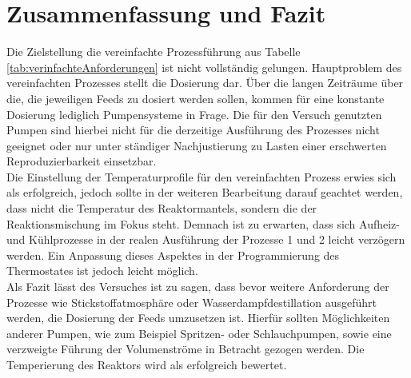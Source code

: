 \section{Zusammenfassung und Fazit}
\label{sec:zusammenfassung}
Die Zielstellung die vereinfachte Prozessführung aus Tabelle \ref{tab:verinfachteAnforderungen} ist nicht vollständig gelungen. Hauptproblem des vereinfachten Prozesses stellt die Dosierung dar. Über die langen Zeiträume über die, die jeweiligen Feeds zu dosiert werden sollen, kommen für eine konstante Dosierung lediglich Pumpensysteme in Frage. Die für den Versuch genutzten Pumpen sind hierbei nicht für die derzeitige Ausführung des Prozesses nicht geeignet oder nur unter ständiger Nachjustierung zu Lasten einer erschwerten Reproduzierbarkeit einsetzbar.\\
Die Einstellung der Temperaturprofile für den vereinfachten Prozess erwies sich als erfolgreich, jedoch sollte in der weiteren Bearbeitung darauf geachtet werden, dass nicht die Temperatur des Reaktormantels, sondern die der Reaktionsmischung im Fokus steht. Demnach ist zu erwarten, dass sich Aufheiz- und Kühlprozesse in der realen Ausführung der Prozesse 1 und 2 leicht verzögern werden. Ein Anpassung dieses Aspektes in der Programmierung des Thermostates ist jedoch leicht möglich.\\

Als Fazit lässt des Versuches ist zu sagen, dass bevor weitere Anforderung der Prozesse wie Stickstoffatmosphäre oder Wasserdampfdestillation ausgeführt werden, die Dosierung der Feeds umzusetzen ist. Hierfür sollten Möglichkeiten anderer Pumpen, wie zum Beispiel Spritzen- oder Schlauchpumpen, sowie eine verzweigte Führung der Volumenströme in Betracht gezogen werden. Die Temperierung des Reaktors wird als erfolgreich bewertet.
